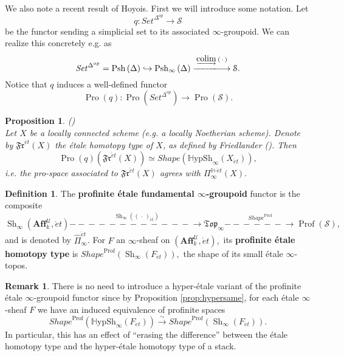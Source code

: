 \documentclass[12pt]{amsart}
\newtheorem{proposition}[dummy]{Proposition}
\theoremstyle{definition}
\newtheorem{definition}[dummy]{Definition}
\newtheorem{remark}[dummy]{Remark}
\newcommand{\cS}{\mathcal{S}}
\newcommand{\cU}{\mathcal{U}}
\newcommand{\Affku}{\mathbf{Aff}^{\cU}_{k}}
\newcommand{\Topi}{\mathfrak{Top}_\i}
\newcommand{\Sh}{\operatorname{Sh}}
\newcommand{\et}{\acute{e}t}
\renewcommand{\i}{\infty}
\def\Pro{\operatorname{Pro}}
\DeclareMathOperator{\Psh}{Psh}
\def\Pshi{\operatorname{Psh}_\i}
\def\Shi{\Sh_\i}
\def\Hshi{\mathbb{H}\mathrm{ypSh}_\i}
\def\colim{\underrightarrow{\mbox{colim}\vspace{0.5pt}}\mspace{4mu}}
\def\blank{\mspace{3mu}\cdot\mspace{3mu}}
\def\Profs{\operatorname{Prof}\left(\cS\right)}
\def\Prof{\operatorname{Prof}}
\def\Shape{\mathit{Shape}}
\def\Set{\mathit{Set}}
\def\longlongrightarrow{-\!\!\!-\!\!\!-\!\!\!-\!\!\!-\!\!\!-\!\!\!\longrightarrow}
\def\longlonglongrightarrow{-\!\!\!-\!\!\!-\!\!\!-\!\!\!-\!\!\!-\!\!\!\longlongrightarrow}
\begin{document}
We also note a recent result of Hoyois. First we will introduce some notation. Let $$q:\Set^{\Delta^{op}} \to \cS$$ be the functor sending a simplicial set to its associated $\i$-groupoid. We can realize this concretely e.g. as $$\Set^{\Delta^{op}}=\Psh\left(\Delta\right) \hookrightarrow \Pshi\left(\Delta\right) \stackrel{\colim\left(\blank\right)}{\longlongrightarrow} \cS.$$ Notice that $q$ induces a well-defined functor $$\Pro\left(q\right):\Pro\left(\Set^{\Delta^{op}}\right) \to \Pro\left(\cS\right).$$

\begin{proposition}(\cite[Corollary 3.4]{Hoyois})\label{prop: Hoyois}\\
Let $X$ be a locally connected scheme (e.g. a locally Noetherian scheme). Denote by $\mathfrak{Fr}^{\et}\left(X\right)$  the \'etale homotopy type of $X$, as defined by Friedlander (\cite[Definition 4.4]{Friedlander}). Then $$\Pro\left(q\right)\left(\mathfrak{Fr}^{\et}\left(X\right)\right)\simeq \Shape\left(\Hshi\left(X_{\et}\right)\right),$$ i.e. the pro-space associated to $\mathfrak{Fr}^{\et}\left(X\right)$ agrees with $\Pi^{\mathbb{H}\mbox{-}\et}_\i\left(X\right).$
\end{proposition}




\begin{definition}
The \textbf{profinite \'etale fundamental $\i$-groupoid} functor is the composite
$$\Shi\left(\Affku,\et\right) \stackrel{\Shi\left(\left(\blank\right)_{\et}\right)}{\longlonglongrightarrow} \Topi \stackrel{\Shape^{\Prof}}{\longlongrightarrow} \Profs,$$ and is denoted by $\widehat{\Pi}^{\et}_\i$. For $F$ an $\i$-sheaf on $\left(\Affku,\et\right),$ its \textbf{profinite \'etale homotopy type} is $\Shape^{\Prof}\left(\Shi\left(F_{\et}\right)\right),$ the shape of its small \'etale $\i$-topos.
\end{definition}

\begin{remark}
There is no need to introduce a hyper-\'etale variant of the profinite \'etale $\i$-groupoid functor since by Proposition \ref{prop:hypersame}, for each \'etale $\i$-sheaf $F$ we have an induced equivalence of profinite spaces $$\Shape^{\Prof}\left(\Hshi\left(F_{\et}\right)\right) \stackrel{\sim}{\longrightarrow} \Shape^{\Prof}\left(\Shi\left(F_{\et}\right)\right).$$ In particular, this has an effect of ``erasing the difference'' between the \'etale homotopy type and the hyper-\'etale homotopy type of a stack.
\end{remark}
\end{document}
